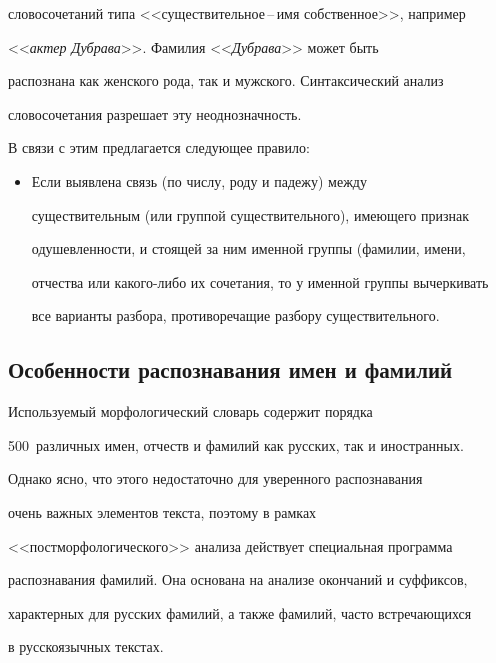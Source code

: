 словосочетаний типа <<существительное\,--\,имя собственное>>, например 


<<\textit{актер Дубрава}>>. Фамилия <<\textit{Дубрава}>> может быть 


распознана как женского рода, так и мужского. Синтаксический анализ 


словосочетания разрешает эту неоднозначность. 


   


   В связи с этим предлагается следующее правило: 


   \begin{itemize}


   \item[(в)] Если выявлена связь (по числу, роду и падежу) между 


существительным (или группой существительного), имеющего признак 


одушевленности, и стоящей за ним именной группы (фамилии, имени, 


отчества или какого-ли\-бо их сочетания, то у именной группы вычеркивать 


все варианты разбора, противоречащие разбору существительного. 


   \end{itemize}


   


   \subsection{Особенности распознавания имен и фамилий}


   


   Используемый морфологический словарь содержит порядка 


500~различных имен, отчеств и фамилий как русских, так и иностранных. 


Однако ясно, что этого недостаточно для уверенного распознавания 


очень важных элементов текста, поэтому в рамках 


<<постморфологического>> анализа действует специальная программа 


распознавания  фамилий. Она основана на анализе окончаний и суффиксов, 


характерных для русских фамилий, а также фамилий, часто встречающихся 


в русскоязычных текстах.


